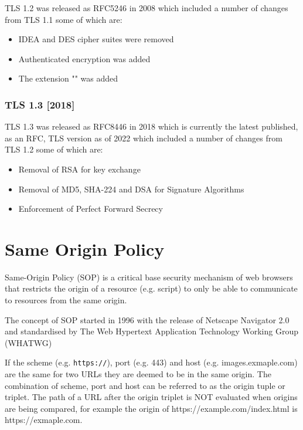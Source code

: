 \documentclass{mscreport}
\begin{document}
TLS 1.2 was released as RFC5246 in 2008 \cite{Dierks2008-uy} which included a number of changes from TLS 1.1 some of which are:
\begin{itemize}
	\setlength\itemsep{0.1em}
	\item IDEA and DES cipher suites were removed
	\item Authenticated encryption was added
	\item The extension "" was added
\end{itemize}


\subsubsection{TLS 1.3 [2018]}

TLS 1.3 was released as RFC8446 in 2018 \cite{Rescorla2018-wb} which is currently the latest published, as an RFC, TLS version as of 2022 which included a number of changes from TLS 1.2 some of which are:
\begin{itemize}
	\setlength\itemsep{0.1em}
	\item Removal of RSA for key exchange
	\item Removal of MD5, SHA-224 and DSA for Signature Algorithms
	\item Enforcement of Perfect Forward Secrecy
\end{itemize}

\newpage

\section{Same Origin Policy}
\vspace{0.3cm}
\noindent
Same-Origin Policy (SOP) is a critical base security mechanism of web browsers that restricts the origin of a resource (e.g. script) to only be able to communicate to resources from the same origin.

\vspace{0.3cm}
\noindent
The concept of SOP started in 1996 with the release of Netscape Navigator 2.0 \cite{Preston2012-cs} and standardised by The Web Hypertext Application Technology Working Group (WHATWG) \cite{Multiple1996-ju}

\vspace{0.3cm}
\noindent
If the scheme (e.g. \texttt{https://}), port (e.g. 443) and host (e.g. images.exmaple.com) are the same for two URLs they are deemed to be in the same origin. The combination of scheme, port and host can be referred to as the origin tuple or triplet. The path of a URL after the origin triplet is NOT evaluated when origins are being compared, for example the origin of https://example.com/index.html is https://exmaple.com.
\end{document}
